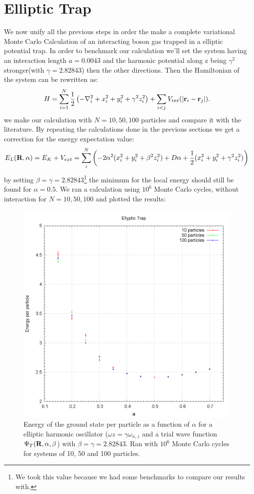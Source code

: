 \documentclass[10pt,a4paper,titlepage]{article}
\begin{document}
\section*{Elliptic Trap}
\noindent We now unify all the previous steps in order the make a complete variational Monte Carlo Calculation of an interacting boson gas trapped in a elliptic potential trap. In order to benchmark our calculation we'll set the system having an interaction length $a=0.0043$ and the harmonic potential along z being $\gamma^2$ stronger(with $\gamma=2.82843$) then the other directions. Then the Hamiltonian of the system can be rewritten as: 
 \begin{equation}
H=\sum_{i=1}^N\frac{1}{2}\left(-\nabla^2_i+x_i^2+y_i^2+\gamma^2 z_i^2\right)+\sum_{i<j}V_{int}(|{\bf r}_i-{\bf r}_j|).
\end{equation} 
we make our calculation with $N=10,50,100$ particles and compare it with the literature. By repeating the calculations done in the previous sections we get a correction for the energy expectation value:
\[
   E_{L}({\bf R},\alpha)=E_{K} + V_{ext} = \sum_i^N \left( -2 \alpha^2 (x_i^2+ y_i^2 + \beta ^2 z_i^2) + D \alpha + \frac{1}{2}(x_i^2+ y_i^2 + \gamma ^2 z_i^2) \right)
   \label{eq:locale2}
\]
by setting $\beta=\gamma=2.82843$\footnote{We took this value because we had some benchmarks to compare our results with.} the minimum for the local energy should still be found for $\alpha = 0.5$. We ran a calculation using $10^6$ Monte Carlo cycles, without interaction for $N=10,50,100$ and plotted the results:
\begin{center}
\begin{figure}[H]
 \centering
  \includegraphics[width=.9\linewidth]{plot_ellyptic.png}
\caption{{\footnotesize Energy of the ground state per particle as a function of $\alpha$ for a elliptic harmonic oscillator ($\omega z = \gamma \omega_{x,z}$ and a trial wave function $\Psi_{T}( {\bf{R}, \alpha, \beta}$) with $\beta = \gamma = 2.82843$. Ran with $10^6$ Monte Carlo cycles for systems of 10, 50 and 100 particles.}}
\label{fig:fig6}
\end{figure}
\end{center}
\end{document}
